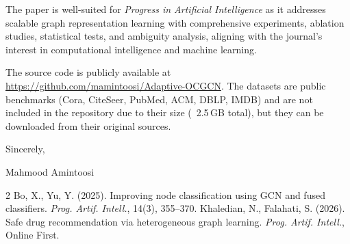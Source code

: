 \documentclass{article}
\begin{document}
The paper is well-suited for \textit{Progress in Artificial Intelligence} as it addresses scalable graph representation learning with comprehensive experiments, ablation studies, statistical tests, and ambiguity analysis, aligning with the journal's interest in computational intelligence and machine learning.

The source code is publicly available at \url{https://github.com/mamintoosi/Adaptive-OCGCN}. The datasets are public benchmarks (Cora, CiteSeer, PubMed, ACM, DBLP, IMDB) and are not included in the repository due to their size (~2.5\,GB total), but they can be downloaded from their original sources.

\bigskip

Sincerely,

Mahmood Amintoosi

\begin{thebibliography}{2}
 Bo, X., Yu, Y. (2025). Improving node classification using GCN and fused classifiers. \textit{Prog. Artif. Intell.}, 14(3), 355--370.
 Khaledian, N., Falahati, S. (2026). Safe drug recommendation via heterogeneous graph learning. \textit{Prog. Artif. Intell.}, Online First.
\end{thebibliography}
\end{document}
